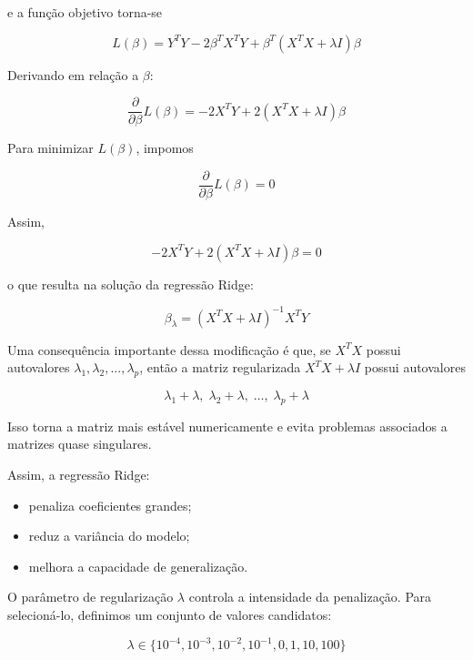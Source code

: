 \documentclass{article}
\begin{document}
e a função objetivo torna-se

\begin{equation*}
    L(\beta) = Y^TY - 2\beta^TX^TY + \beta^T(X^TX + \lambda I)\beta
\end{equation*}

Derivando em relação a $\beta$:

\begin{equation*}
    \frac{\partial}{\partial \beta} L(\beta) = -2X^TY + 2(X^TX + \lambda I)\beta
\end{equation*}

Para minimizar $L(\beta)$, impomos

\begin{equation*}
    \frac{\partial}{\partial \beta}L(\beta) = 0
\end{equation*}

Assim,

\begin{equation*}
    -2X^TY + 2(X^TX + \lambda I)\beta = 0
\end{equation*}

o que resulta na solução da regressão Ridge:

\begin{equation*}
    \beta_{\lambda} = (X^TX + \lambda I)^{-1}X^TY
\end{equation*}

Uma consequência importante dessa modificação é que, se $X^TX$ possui
autovalores $\lambda_1, \lambda_2, ..., \lambda_p$, então a matriz
regularizada $X^TX + \lambda I$ possui autovalores

\[
\lambda_1 + \lambda,\;
\lambda_2 + \lambda,\;
\dots,\;
\lambda_p + \lambda
\]

Isso torna a matriz mais estável numericamente e evita problemas
associados a matrizes quase singulares.

Assim, a regressão Ridge:

\begin{itemize}
\item penaliza coeficientes grandes;
\item reduz a variância do modelo;
\item melhora a capacidade de generalização.
\end{itemize}

O parâmetro de regularização $\lambda$ controla a intensidade da
penalização. Para selecioná-lo, definimos um conjunto de valores
candidatos:

\begin{equation*}
    \lambda \in \{10^{-4}, 10^{-3}, 10^{-2}, 10^{-1}, 0, 1, 10, 100\}
\end{equation*}
\end{document}
